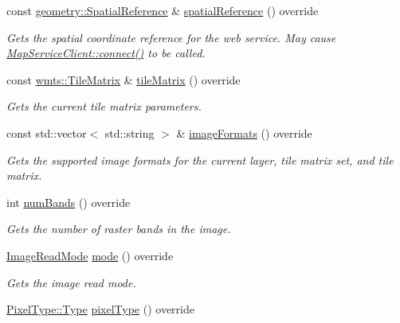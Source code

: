\begin{DoxyCompactItemize}
const \hyperlink{classdg_1_1deepcore_1_1geometry_1_1_spatial_reference}{geometry\+::\+Spatial\+Reference} \& \hyperlink{classdg_1_1deepcore_1_1imagery_1_1_tile_json_client_acc05d5ab4825a2009a70feac6b454399}{spatial\+Reference} () override
\begin{DoxyCompactList}\small\item\em Gets the spatial coordinate reference for the web service. May cause \hyperlink{group___imagery_module_ga5e5f58c725cafba7966936f688a6ade0}{Map\+Service\+Client\+::connect()} to be called. \end{DoxyCompactList}\item 
const \hyperlink{structdg_1_1deepcore_1_1imagery_1_1wmts_1_1_tile_matrix}{wmts\+::\+Tile\+Matrix} \& \hyperlink{classdg_1_1deepcore_1_1imagery_1_1_tile_json_client_a80c608a7f624630a623736c69dd721fb}{tile\+Matrix} () override
\begin{DoxyCompactList}\small\item\em Gets the current tile matrix parameters. \end{DoxyCompactList}\item 
const std\+::vector$<$ std\+::string $>$ \& \hyperlink{classdg_1_1deepcore_1_1imagery_1_1_tile_json_client_a4c136ba864107a5506be276dbc02e662}{image\+Formats} () override
\begin{DoxyCompactList}\small\item\em Gets the supported image formats for the current layer, tile matrix set, and tile matrix. \end{DoxyCompactList}\item 
int \hyperlink{classdg_1_1deepcore_1_1imagery_1_1_tile_json_client_ab232cab60d32f73a228d9d1a21f7c7b3}{num\+Bands} () override
\begin{DoxyCompactList}\small\item\em Gets the number of raster bands in the image. \end{DoxyCompactList}\item 
\hyperlink{group___imagery_module_ga1db94ae833853b71ed501bb1ea8c1c24}{Image\+Read\+Mode} \hyperlink{classdg_1_1deepcore_1_1imagery_1_1_tile_json_client_a12ee44931cfd73d2a3da13ecab2a290f}{mode} () override
\begin{DoxyCompactList}\small\item\em Gets the image read mode. \end{DoxyCompactList}\item 
\hyperlink{namespacedg_1_1deepcore_1_1imagery_1_1_pixel_type_a5f0c62edf4601cbd15e52b381697069d}{Pixel\+Type\+::\+Type} \hyperlink{classdg_1_1deepcore_1_1imagery_1_1_tile_json_client_a1f81383c171f1b1acb11b441d0c5a77a}{pixel\+Type} () override

\end{DoxyCompactItemize}
